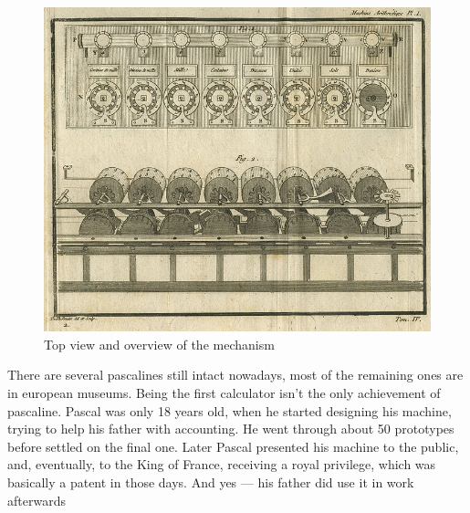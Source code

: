 \documentclass{article}
\begin{document}
            \begin{figure}
                \centering
                \includegraphics[scale=0.3]{images/devices/device_pascaline_scheme.jpg}
                \caption{Top view and overview of the mechanism}
            \end{figure}

            There are several pascalines still intact nowadays, most of the remaining ones are in european museums. Being the first calculator isn't the only achievement
            of pascaline. Pascal was only 18 years old, when he started designing his machine, trying to help his father with accounting. He went through about 50 prototypes
            before settled on the final one. Later Pascal presented his machine to the public, and, eventually, to the King of France, receiving a royal privilege, which 
            was basically a patent in those days. And yes --- his father did use it in work afterwards \par
\end{document}
